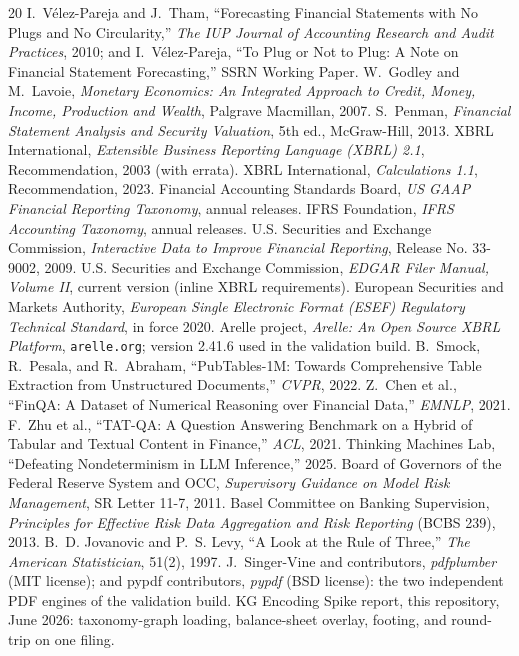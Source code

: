 \documentclass[11pt]{article}
\begin{document}


\begin{thebibliography}{20}\small
{} I.~V\'elez-Pareja and J.~Tham, ``Forecasting Financial Statements with No Plugs and No Circularity,'' \emph{The IUP Journal of Accounting Research and Audit Practices}, 2010; and I.~V\'elez-Pareja, ``To Plug or Not to Plug: A Note on Financial Statement Forecasting,'' SSRN Working Paper.
 W.~Godley and M.~Lavoie, \emph{Monetary Economics: An Integrated Approach to Credit, Money, Income, Production and Wealth}, Palgrave Macmillan, 2007.
 S.~Penman, \emph{Financial Statement Analysis and Security Valuation}, 5th ed., McGraw-Hill, 2013.
 XBRL International, \emph{Extensible Business Reporting Language (XBRL) 2.1}, Recommendation, 2003 (with errata).
 XBRL International, \emph{Calculations 1.1}, Recommendation, 2023.
 Financial Accounting Standards Board, \emph{US GAAP Financial Reporting Taxonomy}, annual releases.
 IFRS Foundation, \emph{IFRS Accounting Taxonomy}, annual releases.
 U.S. Securities and Exchange Commission, \emph{Interactive Data to Improve Financial Reporting}, Release No. 33-9002, 2009.
 U.S. Securities and Exchange Commission, \emph{EDGAR Filer Manual, Volume II}, current version (inline XBRL requirements).
 European Securities and Markets Authority, \emph{European Single Electronic Format (ESEF) Regulatory Technical Standard}, in force 2020.
 Arelle project, \emph{Arelle: An Open Source XBRL Platform}, \texttt{arelle.org}; version 2.41.6 used in the validation build.
 B.~Smock, R.~Pesala, and R.~Abraham, ``PubTables-1M: Towards Comprehensive Table Extraction from Unstructured Documents,'' \emph{CVPR}, 2022.
 Z.~Chen et al., ``FinQA: A Dataset of Numerical Reasoning over Financial Data,'' \emph{EMNLP}, 2021.
 F.~Zhu et al., ``TAT-QA: A Question Answering Benchmark on a Hybrid of Tabular and Textual Content in Finance,'' \emph{ACL}, 2021.
 Thinking Machines Lab, ``Defeating Nondeterminism in LLM Inference,'' 2025.
 Board of Governors of the Federal Reserve System and OCC, \emph{Supervisory Guidance on Model Risk Management}, SR Letter 11-7, 2011.
 Basel Committee on Banking Supervision, \emph{Principles for Effective Risk Data Aggregation and Risk Reporting} (BCBS 239), 2013.
 B.~D. Jovanovic and P.~S. Levy, ``A Look at the Rule of Three,'' \emph{The American Statistician}, 51(2), 1997.
 J.~Singer-Vine and contributors, \emph{pdfplumber} (MIT license); and pypdf contributors, \emph{pypdf} (BSD license): the two independent PDF engines of the validation build.
 KG Encoding Spike report, this repository, June 2026: taxonomy-graph loading, balance-sheet overlay, footing, and round-trip on one filing.
\end{thebibliography}
\end{document}
